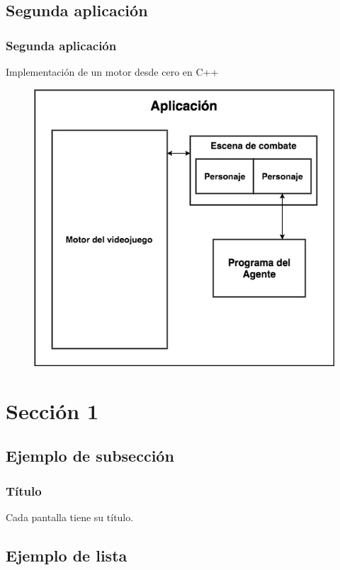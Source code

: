 \documentclass{beamer}
\begin{document}
\subsection{Segunda aplicación}
\begin{frame}
\frametitle{Segunda aplicación}
Implementación de un motor desde cero en C++

\begin{figure}
	\includegraphics[scale=0.3]{../otros/otrasCapturas/block.png} 
\end{figure}

\end{frame}


\section{Sección 1} 
\subsection{Ejemplo de subsección}
\begin{frame}
\frametitle{Título} 
Cada pantalla tiene su título.
\end{frame}

\subsection{Ejemplo de lista}
\end{document}
